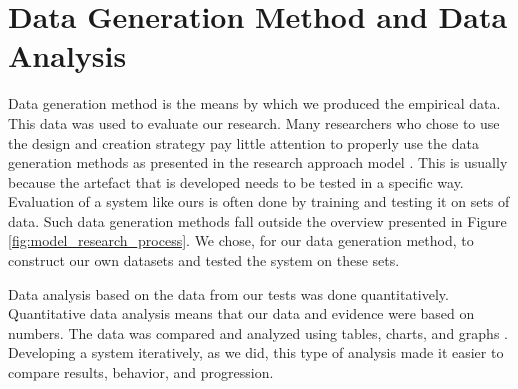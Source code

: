 \section{Data Generation Method and Data Analysis}
\label{sec:data_generation_methods_and_data_analysis}
Data generation method is the means by which we produced the empirical data. This data was used to evaluate our research. Many researchers who chose to use the design and creation strategy pay little attention to properly use the data generation methods as presented in the research approach model \citep[pp.~116--117]{oates2005researching}. This is usually because the artefact that is developed needs to be tested in a specific way. Evaluation of a system like ours is often done by training and testing it on sets of data. Such data generation methods fall outside the overview presented in Figure \ref{fig:model_research_process}. We chose, for our data generation method, to construct our own datasets and tested the system on these sets.

Data analysis based on the data from our tests was done quantitatively. Quantitative data analysis means that our data and evidence were based on numbers. The data was compared and analyzed using tables, charts, and graphs \citep[chap.~17]{oates2005researching}. Developing a system iteratively, as we did, this type of analysis made it easier to compare results, behavior, and progression.